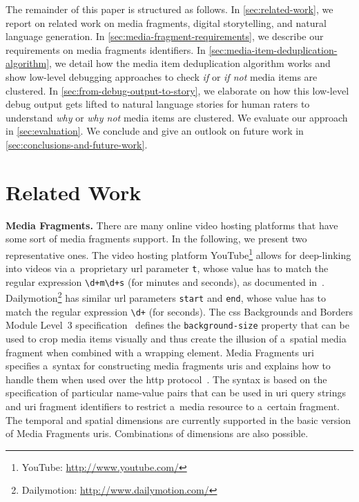 \documentclass{article}
\begin{document}
The remainder of this paper is structured as follows. In \autoref{sec:related-work}, we report on related work on media fragments, digital storytelling, and natural language generation. In \autoref{sec:media-fragment-requirements}, we describe our requirements on media fragments identifiers. In \autoref{sec:media-item-deduplication-algorithm}, we detail how the media item deduplication algorithm works and show low-level debugging approaches to check
\emph{if} or \emph{if not} media items are clustered. In \autoref{sec:from-debug-output-to-story}, we elaborate on how this low-level debug output gets lifted
to natural language stories for human raters to understand \emph{why} or \emph{why not} media items are clustered. We evaluate our approach in \autoref{sec:evaluation}. We conclude and give an outlook on future work in \autoref{sec:conclusions-and-future-work}.


\section{Related Work}
\label{sec:related-work}
\textbf{Media Fragments.} There are many online video hosting platforms that have some sort of media fragments support. In the following, we present two representative ones. The video hosting platform YouTube\footnote{YouTube: \url{http://www.youtube.com/}} allows for deep-linking into videos via a~proprietary {\sc url} parameter \texttt{t}, whose value has to match the regular expression \texttt{\textbackslash d+m\textbackslash d+s} (for minutes and seconds),
as documented in~\cite{youtube2008link}. Dailymotion\footnote{Dailymotion: \url{http://www.dailymotion.com/}} has similar {\sc url} parameters \texttt{start} and \texttt{end}, whose value has to match the regular expression \texttt{\textbackslash d+} (for seconds). The {\sc css} Backgrounds and Borders Module Level~3 specification~\cite{bos2012css3} defines the \texttt{background-size} property that can be used to crop media items visually and thus create the illusion of a~spatial media fragment when combined with a wrapping element. Media Fragments {\sc uri}~\cite{troncy2012mediafragments} specifies a~syntax for constructing media fragments {\sc uri}s and explains how to handle them when used over the {\sc http} protocol~\cite{fielding1999http}. The syntax is based on the specification of particular name-value pairs that can be used in {\sc uri} query strings and {\sc uri} fragment identifiers to restrict a~media resource to a~certain fragment. The temporal and spatial dimensions are currently supported in the basic version of Media Fragments {\sc uri}s. Combinations of dimensions are also possible.
\end{document}
